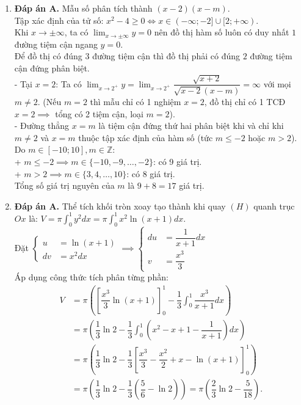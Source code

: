 \documentclass[12pt,a4paper]{article}
\begin{document}
\begin{enumerate}[label=\textbf{Câu \arabic*:}, leftmargin=*]
\item \textbf{Đáp án A.} Mẫu số phân tích thành $(x - 2)(x - m)$.\\
Tập xác định của tử số: $x^2 - 4 \ge 0 \iff x \in (-\infty; -2] \cup [2; +\infty)$.\\
Khi $x \to \pm\infty$, ta có $\lim_{x \to \pm\infty} y = 0$ nên đồ thị hàm số luôn có duy nhất $1$ đường tiệm cận ngang $y = 0$.\\
Để đồ thị có đúng $3$ đường tiệm cận thì đồ thị phải có đúng $2$ đường tiệm cận đứng phân biệt.\\
- Tại $x = 2$: Ta có $\lim_{x \to 2^+} y = \lim_{x \to 2^+} \dfrac{\sqrt{x+2}}{\sqrt{x-2}(x-m)} = \infty$ với mọi $m \neq 2$. (Nếu $m = 2$ thì mẫu chỉ có 1 nghiệm $x = 2$, đồ thị chỉ có 1 TCĐ $x = 2 \implies$ tổng có 2 tiệm cận, loại $m = 2$).\\
- Đường thẳng $x = m$ là tiệm cận đứng thứ hai phân biệt khi và chỉ khi $m \neq 2$ và $x = m$ thuộc tập xác định của hàm số (tức $m \le -2$ hoặc $m > 2$).\\
Do $m \in [-10; 10], m \in \mathbb{Z}$:\\
+ $m \le -2 \implies m \in \{-10, -9, \dots, -2\}$: có 9 giá trị.\\
+ $m > 2 \implies m \in \{3, 4, \dots, 10\}$: có 8 giá trị.\\
Tổng số giá trị nguyên của $m$ là $9 + 8 = 17$ giá trị.

\item \textbf{Đáp án A.} Thể tích khối tròn xoay tạo thành khi quay $(H)$ quanh trục $Ox$ là:
$V = \pi \int_0^1 y^2 dx = \pi \int_0^1 x^2 \ln(x + 1) dx$.\\
Đặt $\left\{\begin{aligned} u &= \ln(x + 1) \\ dv &= x^2 dx \end{aligned}\right. \implies \left\{\begin{aligned} du &= \dfrac{1}{x + 1} dx \\ v &= \dfrac{x^3}{3} \end{aligned}\right.$\\
Áp dụng công thức tích phân từng phần:
\begin{align*}
V &= \pi \left( \left[ \dfrac{x^3}{3} \ln(x + 1) \right]_0^1 - \dfrac{1}{3} \int_0^1 \dfrac{x^3}{x + 1} dx \right) \\
&= \pi \left( \dfrac{1}{3} \ln 2 - \dfrac{1}{3} \int_0^1 \left( x^2 - x + 1 - \dfrac{1}{x + 1} \right) dx \right) \\
&= \pi \left( \dfrac{1}{3} \ln 2 - \dfrac{1}{3} \left[ \dfrac{x^3}{3} - \dfrac{x^2}{2} + x - \ln(x + 1) \right]_0^1 \right) \\
&= \pi \left( \dfrac{1}{3} \ln 2 - \dfrac{1}{3} \left( \dfrac{5}{6} - \ln 2 \right) \right) = \pi \left( \dfrac{2}{3} \ln 2 - \dfrac{5}{18} \right).
\end{align*}


\end{enumerate}
\end{document}
